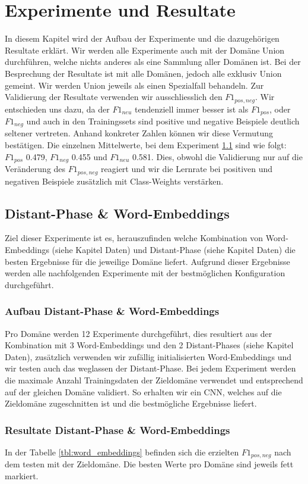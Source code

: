 \chapter{Experimente und Resultate}
In diesem Kapitel wird der Aufbau der Experimente und die dazugehörigen Resultate erklärt. Wir werden alle Experimente auch mit der Domäne Union durchführen, welche nichts anderes als eine Sammlung aller Domänen ist. Bei der Besprechung der Resultate ist mit alle Domänen, jedoch alle exklusiv Union gemeint. Wir werden Union jeweils als einen Spezialfall behandeln.
Zur Validierung der Resultate verwenden wir ausschliesslich den $F1_{pos,neg}$. Wir entschieden uns dazu, da der $F1_{neu}$ tendenziell immer besser ist als $F1_{pos}$, oder $F1_{neg}$ und auch in den Trainingssets sind positive und negative Beispiele deutlich seltener vertreten. Anhand konkreter Zahlen können wir diese Vermutung bestätigen. Die einzelnen Mittelwerte, bei dem Experiment \ref{sec:Distant-Phase and Word-Embedding} sind wie folgt: $F1_{pos}$ 0.479, $F1_{neg}$ 0.455 und $F1_{neu}$ 0.581. Dies, obwohl die Validierung nur auf die Veränderung des $F1_{pos,neg}$ reagiert und wir die Lernrate bei positiven und negativen Beispiele zusätzlich mit Class-Weights verstärken.
\section{Distant-Phase \& Word-Embeddings}\label{sec:Distant-Phase and Word-Embedding}
Ziel dieser Experimente ist es, herauszufinden welche Kombination von Word-Embeddings (siehe Kapitel Daten) und Distant-Phase (siehe Kapitel Daten) die besten Ergebnisse für die jeweilige Domäne liefert. Aufgrund dieser Ergebnisse werden alle nachfolgenden Experimente mit der bestmöglichen Konfiguration durchgeführt.
\subsection{Aufbau Distant-Phase \& Word-Embeddings} Pro Domäne werden 12 Experimente durchgeführt, dies resultiert aus der Kombination mit 3 Word-Embeddings und den 2 Distant-Phases (siehe Kapitel Daten), zusätzlich verwenden wir zufällig initialisierten Word-Embeddings und wir testen auch das weglassen der Distant-Phase. Bei jedem Experiment werden die maximale Anzahl Trainingsdaten der Zieldomäne verwendet und entsprechend auf der gleichen Domäne validiert. So erhalten wir ein CNN, welches auf die Zieldomäne zugeschnitten ist und die bestmögliche Ergebnisse liefert.
\subsection{Resultate Distant-Phase \& Word-Embeddings}
In der Tabelle \ref{tbl:word_embeddings} befinden sich die erzielten $F1_{pos,neg}$ nach dem testen mit der Zieldomäne. Die besten Werte pro Domäne sind jeweils fett markiert.
